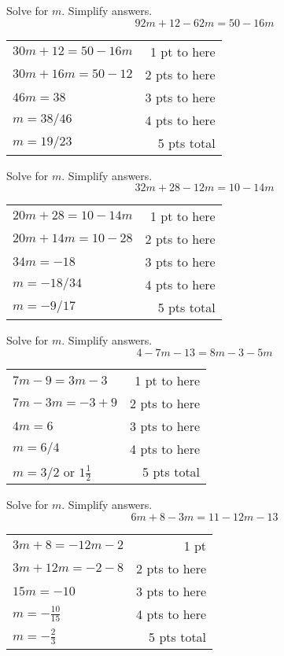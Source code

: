 {
	Solve for $m$. Simplify answers. $$92m+12-62m=50-16m$$
}
{
	\begin{tabular}{l r}
	$30m+12=50-16m$ & 1 pt to here\\
	$30m+16m=50-12$ & 2 pts to here\\
	$46m=38$ & 3 pts to here\\
	$m=38/46$ & 4 pts to here\\
	$m=19/23$ & 5 pts total\\
	\end{tabular}
}

{
	Solve for $m$. Simplify answers. $$32m+28-12m=10-14m$$
}
{
	\begin{tabular}{l r}
	$20m+28=10-14m$ & 1 pt to here\\
	$20m+14m=10-28$ & 2 pts to here\\
	$34m=-18$ & 3 pts to here\\
	$m=-18/34$  & 4 pts to here\\
	$m=-9/17$ & 5 pts total
	\end{tabular}
}

{
	Solve for $m$. Simplify answers. $$4-7m-13=8m-3-5m$$
}
{
	\begin{tabular}{l r}
	$7m-9=3m-3$ & 1 pt to here\\
	$7m-3m=-3+9$ & 2 pts to here\\
	$4m=6$ & 3 pts to here\\
	$m=6/4$  & 4 pts to here\\
	$m=3/2$ or $1\frac{1}{2}$& 5 pts total
	\end{tabular}
}

{
	Solve for $m$. Simplify answers. $$6m+8-3m=11-12m-13$$
}
{
	\begin{tabular}{l r}
	$3m+8=-12m-2$ & 1 pt\\
	$3m+12m=-2-8$ & 2 pts to here\\
	$15m=-10$ & 3 pts to here\\
	$m=-\frac{10}{15}$ & 4 pts to here\\
	$m=-\frac{2}{3}$ & 5 pts total
	\end{tabular}
}
